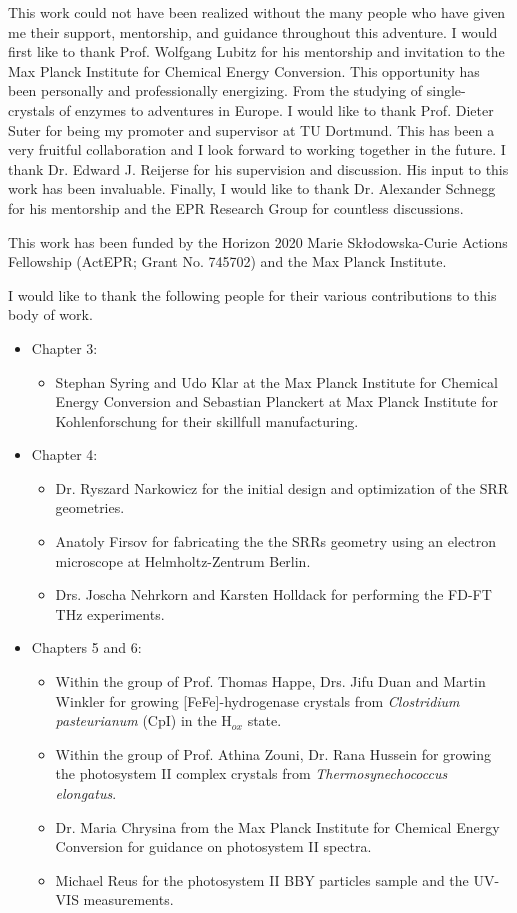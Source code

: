 
This work could not have been realized without the many people who have given me their support, mentorship, and guidance throughout this adventure. I would first like to thank Prof. Wolfgang Lubitz for his mentorship and invitation to the Max Planck Institute for Chemical Energy Conversion. This opportunity has been personally and professionally energizing. From the studying of single-crystals of enzymes to adventures in Europe. I would like to thank Prof. Dieter Suter for being my promoter and supervisor at TU Dortmund. This has been a very fruitful collaboration and I look forward to working together in the future. I thank Dr. Edward J. Reijerse for his supervision and discussion. His input to this work has been invaluable. Finally, I would like to thank Dr. Alexander Schnegg for his mentorship and the EPR Research Group for countless discussions. 

This work has been funded by the Horizon 2020 Marie Sk\l{}odowska-Curie Actions Fellowship (ActEPR; Grant No. 745702) and the Max Planck Institute. 

I would like to thank the following people for their various contributions to this body of work. 
\begin{itemize}
    \item Chapter 3: 
    \begin{itemize}
        \item Stephan Syring and Udo Klar at the Max Planck Institute for Chemical Energy Conversion and Sebastian Planckert at Max Planck Institute for Kohlenforschung for their skillfull manufacturing.
    \end{itemize}
    \item Chapter 4:
    \begin{itemize}
        \item Dr. Ryszard Narkowicz for the initial design and optimization of the SRR geometries. 
        \item Anatoly Firsov for fabricating the the SRRs geometry using an electron microscope at Helmholtz-Zentrum Berlin. 
        \item Drs. Joscha Nehrkorn and Karsten Holldack for performing the FD-FT THz experiments.
    \end{itemize}
    \item Chapters 5 and 6:
    \begin{itemize}
        \item Within the group of Prof. Thomas Happe, Drs. Jifu Duan and Martin Winkler for growing [FeFe]-hydrogenase crystals from {\em Clostridium pasteurianum} (CpI) in the H$_{ox}$ state.
        \item Within the group of Prof. Athina Zouni, Dr. Rana Hussein for growing the photosystem II complex crystals from {\em Thermosynechococcus elongatus}. 
        \item Dr. Maria Chrysina from the Max Planck Institute for Chemical Energy Conversion for guidance on photosystem II spectra.
        \item Michael Reus for the photosystem II BBY particles sample and the UV-VIS measurements.     
    \end{itemize}
\end{itemize}

